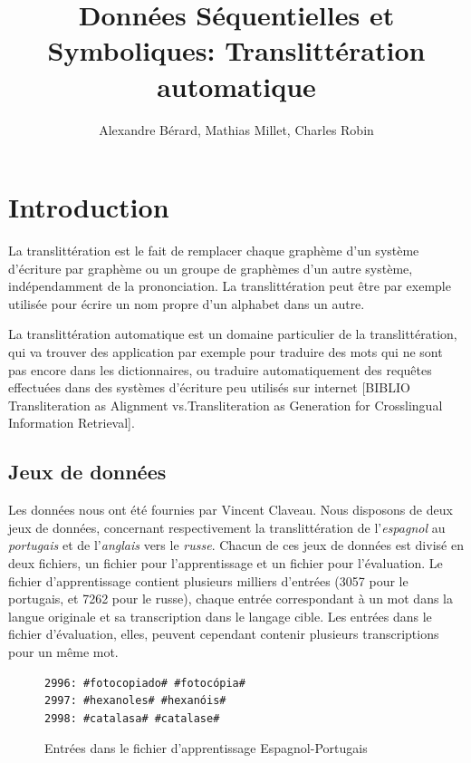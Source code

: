 \documentclass{article}
\begin{document}
\title{Données Séquentielles et Symboliques: Translittération automatique}

\author{Alexandre Bérard, Mathias Millet, Charles Robin}
\maketitle
\begin{abstract}
\end{abstract}
\vspace{0.5em}
\section{Introduction}

La translittération est le fait de remplacer chaque graphème d'un système d'écriture par graphème ou un groupe de graphèmes d'un autre système, indépendamment de la prononciation. La translittération peut être par exemple utilisée pour écrire un nom propre d'un alphabet dans un autre. 

La translittération automatique est un domaine particulier de la translittération, qui va trouver des application par exemple pour traduire des mots qui ne sont pas encore dans les dictionnaires, ou traduire automatiquement des requêtes effectuées dans des systèmes d'écriture peu utilisés sur internet [BIBLIO Transliteration as Alignment vs.Transliteration as Generation for Crosslingual Information Retrieval].


\subsection{Jeux de données}
Les données nous ont été fournies par Vincent Claveau. Nous disposons de deux jeux de données, concernant respectivement la translittération de l'\emph{espagnol} au \emph{portugais} et de l'\emph{anglais} vers le \emph{russe}. Chacun de ces jeux de données est divisé en deux fichiers, un fichier pour l'apprentissage et un fichier pour l'évaluation. Le fichier d'apprentissage contient plusieurs milliers d'entrées (3057 pour le portugais, et 7262 pour le russe), chaque entrée correspondant à un mot dans la langue originale et sa transcription dans le langage cible. Les entrées dans le fichier d'évaluation, elles, peuvent cependant contenir plusieurs transcriptions pour un même mot. 


\begin{figure}[H]
\caption{Entrées dans le fichier d'apprentissage Espagnol-Portugais}
\begin{verbatim}
2996: #fotocopiado# #fotocópia#
2997: #hexanoles# #hexanóis#
2998: #catalasa# #catalase#
\end{verbatim}
\end{figure}
\end{document}
